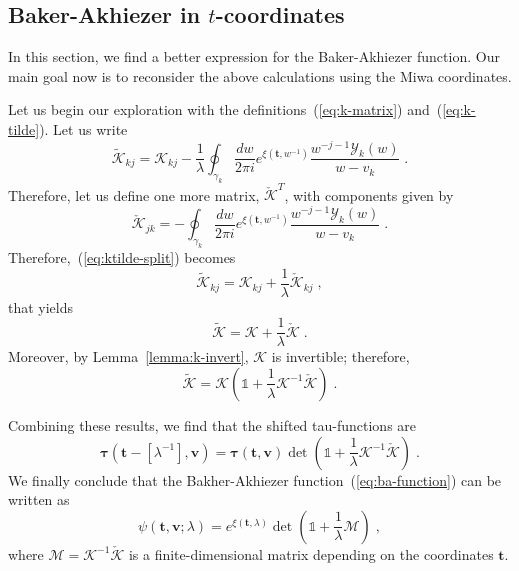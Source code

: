 \documentclass[a4paper,11pt]{amsart}
\begin{document}
\subsection{Baker-Akhiezer in \(t\)-coordinates}

In this section, we find a better expression for the Baker-Akhiezer
function. Our main goal now is to reconsider the above calculations
using the Miwa coordinates.

Let us begin our exploration with the definitions~(\ref{eq:k-matrix})
and~(\ref{eq:k-tilde}). Let us write
\begin{equation}
\label{eq:ktilde-split}
  \widetilde{\mathcal{K}}_{kj} = \mathcal{K}_{kj}
  - \frac{1}{\lambda} \oint_{\gamma_k} \frac{dw}{2\pi i}
    e^{\xi(\bm{t}, w^{- 1})} \frac{w^{-j -1 }\mathcal{Y}_k(w)}{w - v_k} \; .
\end{equation}
Therefore, let us define one more matrix,
\(\check{\bm{\mathcal{K}}}^T\), with components given by
\begin{equation}
  \check{\mathcal{K}}_{jk} =
  - \oint_{\gamma_k} \frac{dw}{2\pi i}
    e^{\xi(\bm{t}, w^{- 1})} \frac{w^{-j -1 }\mathcal{Y}_k(w)}{w - v_k} \; .
\end{equation}
Therefore,~(\ref{eq:ktilde-split}) becomes
\begin{equation}
  \widetilde{\mathcal{K}}_{kj} = 
  \mathcal{K}_{kj}  + \frac{1}{\lambda}
  \check{\mathcal{K}}_{kj} \; , 
\end{equation}
that yields
\begin{equation}
  \widetilde{\bm{\mathcal{K}}} = 
  \bm{\mathcal{K}} + \frac{1}{\lambda}
  \check{\bm{\mathcal{K}}}\; .
\end{equation}
Moreover, by Lemma~\ref{lemma:k-invert}, \(\bm{\mathcal{K}}\) is
invertible; therefore,
\begin{equation}
  \widetilde{\bm{\mathcal{K}}} = 
  \bm{\mathcal{K}}\left( \mathbb{1} + 
  \frac{1}{\lambda}\bm{\mathcal{K}}^{-1}\check{\bm{\mathcal{K}}} \right)\; .
\end{equation}

Combining these results, we find that the shifted tau-functions are
\begin{equation}
  \bm{\tau}(\bm{t} - [\lambda^{-1}], \bm{v}) =
  \bm{\tau}(\bm{t}, \bm{v})
  \det \left( \mathbb{1} + \frac{1}{\lambda}
  \bm{\mathcal{K}}^{-1} \check{\bm{\mathcal{K}}} \right)\; .
\end{equation}
We finally conclude that the Bakher-Akhiezer
function~(\ref{eq:ba-function}) can be written as
\begin{equation}
\label{eq:ba-fredholm}
  \psi(\bm{t},\bm{v}; \lambda) = e^{\xi(\bm{t}, \lambda)}
  \det \left( \mathbb{1} + 
    \frac{1}{\lambda} \bm{\mathcal{M}}
  \right)\; , 
\end{equation}
where \(\bm{\mathcal{M}} =
\bm{\mathcal{K}}^{-1}\check{\bm{\mathcal{K}}}\) is a
finite-dimensional matrix depending on the coordinates
\(\bm{t}\).
\end{document}
